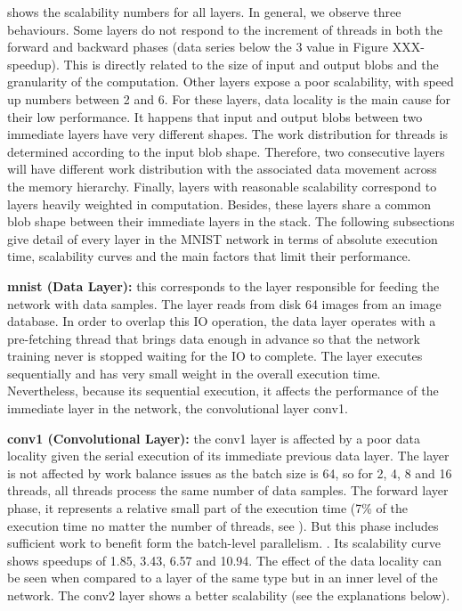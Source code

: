  shows the scalability numbers for all
layers. In general, we observe three behaviours. Some layers do
not respond to the increment of threads in both the forward and
backward phases (data series below the 3 value in Figure XXX-
speedup). This is directly related to the size of input and output
blobs and the granularity of the computation. Other layers expose
a poor scalability, with speed up numbers between 2 and 6. For
these layers, data locality is the main cause for their low performance. It happens that input and output blobs between two immediate layers have very different shapes. The work distribution for
threads is determined according to the input blob shape. Therefore, two consecutive layers will have different work distribution
with the associated data movement across the memory hierarchy.
Finally, layers with reasonable scalability correspond to layers
heavily weighted in computation. Besides, these layers share a
common blob shape between their immediate layers in the stack.
The following subsections give detail of every layer in the MNIST
network in terms of absolute execution time, scalability curves
and the main factors that limit their performance.

\textbf{mnist (Data Layer):} this corresponds to the layer responsible for
feeding the network with data samples. The layer reads from disk
64 images from an image database. In order to overlap this IO
operation, the data layer operates with a pre-fetching thread that
brings data enough in advance so that the network training never
is stopped waiting for the IO to complete. The layer executes
sequentially and has very small weight in the overall execution
time. Nevertheless, because its sequential execution, it affects the
performance of the immediate layer in the network, the convolutional layer conv1.

\textbf{conv1 (Convolutional Layer):} the conv1 layer is affected by a
poor data locality given the serial execution of its immediate
previous data layer. The layer is not affected by work balance
issues as the batch size is 64, so for 2, 4, 8 and 16 threads, all
threads process the same number of data samples. The forward
layer phase, it represents a relative small part of the execution
time (7\% of the execution time no matter the number of threads,
see ). But this phase includes sufficient work to benefit form the batch-level parallelism. . Its scalability curve shows
speedups of 1.85, 3.43, 6.57 and 10.94. The effect of the data
locality can be seen when compared to a layer of the same type
but in an inner level of the network. The conv2 layer shows a
better scalability (see the explanations below). 

